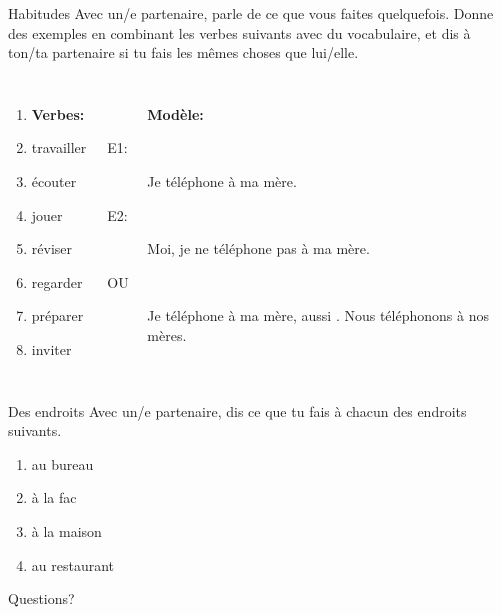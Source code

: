 \documentclass{beamer}
\begin{document}
  \begin{frame}{Habitudes }
    Avec un/e partenaire, parle de ce que vous faites quelquefois.
    Donne des exemples en combinant les verbes suivants avec du vocabulaire, et dis à ton/ta partenaire si tu fais les mêmes choses que lui/elle. \\
    \begin{columns}[t]
        \begin{enumerate}
          \item[] \textbf{Verbes:}
          \item travailler
          \item écouter
          \item jouer
          \item réviser
          \item regarder
          \item préparer
          \item inviter
        \end{enumerate}
        \begin{description}
          \item[] \textbf{Modèle:}
          \item[E1:] Je téléphone à ma mère.
          \item[] 
          \item[E2:] Moi, je ne téléphone pas à ma mère.
          \item[] 
          \item[OU] Je téléphone à ma mère, aussi . Nous téléphonons à nos mères.
          \item[] 
        \end{description}
    \end{columns}
  \end{frame}

  \begin{frame}{Des endroits }
    Avec un/e partenaire, dis ce que tu fais à chacun des endroits suivants. \\
    \begin{enumerate}
      \item au bureau
      \item à la fac
      \item à la maison
      \item au restaurant
    \end{enumerate}
  \end{frame}

  \begin{frame}{}
    \begin{center}
      \Large Questions?
    \end{center}
  \end{frame}
\end{document}
